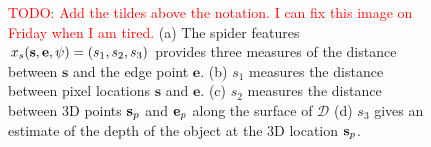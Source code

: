 \documentclass[10pt,twocolumn,letterpaper]{article}
\newcommand{\rgbdimage}{\mathcal{D}}
\newcommand{\pixelidx}{\mathbf{s}}
\newcommand{\edgeimidx}{\mathbf{e}}
\newcommand{\todo}[1]{\textcolor{red}{TODO: #1}}
\begin{document}
\begin{figure}[tb]
        \hfill
        \hfill
        \hfill
    \caption{
    \todo{Add the tildes above the notation. I can fix this image on Friday when I am tired.}
    (a) The spider features $\scalfeat_s(\pixelidx, \edgeimidx, \psi) = (s_1, s_2, s_3)$ provides three measures of the distance between $\pixelidx$ and the edge point $\edgeimidx$.
    (b) $s_1$ measures the distance between pixel locations $\pixelidx$ and $\edgeimidx$.
    (c) $s_2$ measures the distance between 3D points $\pointthreed$ and $\edgethreed$ along the surface of $\rgbdimage$
    (d) $s_3$ gives an estimate of the depth of the object at the 3D location $\pointthreed$.
    }%
    \label{fig:features}
\end{figure}
\end{document}
